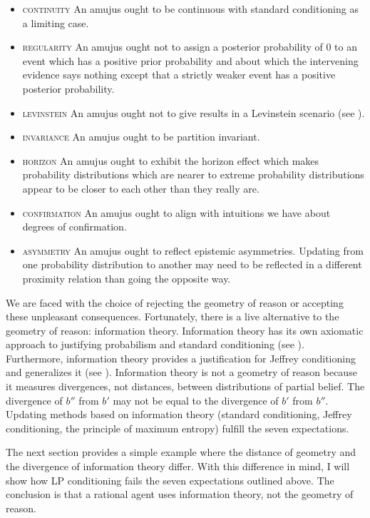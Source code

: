 \documentclass[11pt]{article}
\begin{document}
\begin{itemize}
\item \textsc{continuity} An amujus ought to be continuous with
  standard conditioning as a limiting case.
\item \textsc{regularity} An amujus ought not to assign a posterior
  probability of $0$ to an event which has a positive prior
  probability and about which the intervening evidence says nothing
  except that a strictly weaker event has a positive posterior
  probability.
\item \textsc{levinstein} An amujus ought not to give  results in a Levinstein scenario (see
  ).
\item \textsc{invariance} An amujus ought to be partition invariant.
\item \textsc{horizon} An amujus ought to exhibit the horizon effect
  which makes probability distributions which are nearer to extreme
  probability distributions appear to be closer to each other than
  they really are.
\item \textsc{confirmation} An amujus ought to align with intuitions
  we have about degrees of confirmation.
\item \textsc{asymmetry} An amujus ought to reflect epistemic
  asymmetries. Updating from one probability distribution to another
  may need to be reflected in a different proximity relation than
  going the opposite way.
\end{itemize}

We are faced with the choice of rejecting the geometry of reason or
accepting these unpleasant consequences. Fortunately, there is a live
alternative to the geometry of reason: information theory. Information
theory has its own axiomatic approach to justifying probabilism and
standard conditioning (see ). Furthermore,
information theory provides a justification for Jeffrey conditioning
and generalizes it (see ). Information theory is
not a geometry of reason because it measures divergences, not
distances, between distributions of partial belief. The divergence of
$b''$ from $b'$ may not be equal to the divergence of $b'$ from $b''$.
Updating methods based on information theory (standard conditioning,
Jeffrey conditioning, the principle of maximum entropy) fulfill
the seven expectations.

The next section provides a simple example where the distance of
geometry and the divergence of information theory differ. With this
difference in mind, I will show how LP conditioning fails the seven
expectations outlined above. The conclusion is that a rational agent
uses information theory, not the geometry of reason.
\end{document}
